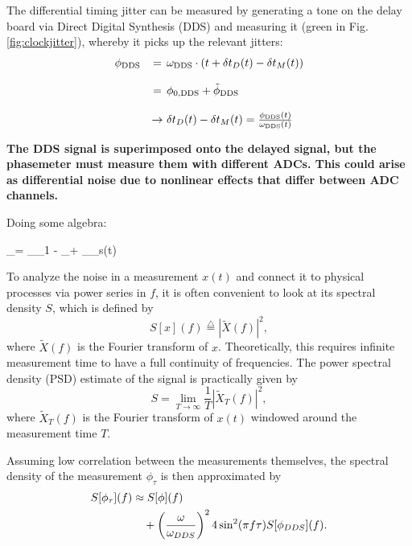 \documentclass{article}
\begin{document}
The differential timing jitter can be measured by generating a tone on the delay board via Direct Digital Synthesis (DDS) and measuring it (green in Fig. \ref{fig:clockjitter}), whereby it picks up the relevant jitters: 
\begin{equation}
    \begin{array}{rc@{\,}c@{\,}l}
    \phi_\text{DDS} &= &&\omega_\text{DDS}\cdot(t + \delta t_D(t) - \delta t_M(t)) \\\\
               &= &&\phi_{0,\text{DDS}} + \tilde\phi_\text{DDS}\\\\
     &\rightarrow &&\delta t_D(t) - \delta t_M(t) = \frac{\phi_\text{DDS}(t)}{\omega_\text{DDS}(t)}

    \end{array}
    \label{eq:correction}
\end{equation}

\textbf{The DDS signal is superimposed onto the delayed signal, but the phasemeter must measure them with different ADCs. This could arise as differential noise due to nonlinear effects that differ between ADC channels.}


Doing some algebra:

\phi_\tau = _\tau \phi_1 - _\tau{} + _\tau \omega_s(t) \cdot {}



To analyze the noise in a measurement $x(t)$ and connect it to physical processes via power series in $f$, it is often convenient to look at its spectral density $S$, which is defined by 
\begin{equation}
    S[x](f) \stackrel{\triangle}{=} |\tilde X(f)|^2,
\end{equation}
where $\tilde X(f)$ is the Fourier transform of $x$. Theoretically, this requires infinite measurement time to have a full continuity of frequencies. The power spectral density (PSD) estimate of the signal is practically given by 
\begin{equation}
    S = \lim_{T \rightarrow \infty} \frac{1}{T} |\tilde X_T(f)|^2,
\end{equation}
where $\tilde X_T(f)$ is the Fourier transform of $x(t)$ windowed around the measurement time $T$. 

Assuming low correlation between the measurements themselves, the spectral density of the measurement $\phi_\tau$ is then approximated by 
\begin{align}
    S[\phi_\tau](f) &\approx  S[\phi](f) \notag \\ &\quad+ \left(\frac{\omega}{\omega_{DDS}}\right)^24\sin^2(\pi f\tau) S[\phi_{DDS}](f).
    \label{eq:cjmodelASD}
\end{align}
\end{document}
